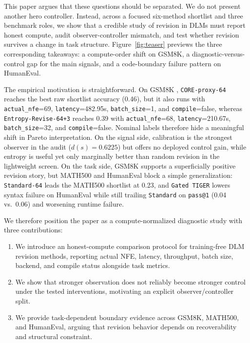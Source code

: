 \documentclass{article}
\begin{document}
This paper argues that these questions should be separated. We do not present another hero controller. Instead, across a focused six-method shortlist and three benchmark roles, we show that a credible study of revision in DLMs must report honest compute, audit observer-controller mismatch, and test whether revision survives a change in task structure. Figure~\ref{fig:teaser} previews the three corresponding takeaways: a compute-order shift on GSM8K, a diagnostic-versus-control gap for the main signals, and a code-boundary failure pattern on HumanEval.

The empirical motivation is straightforward. On GSM8K \citep{cobbe2021gsm8k}, \texttt{CORE-proxy-64} reaches the best raw shortlist accuracy (0.46), but it also runs with \texttt{actual\_nfe}=69, \texttt{latency}=482.95s, \texttt{batch\_size}=1, and \texttt{compile}=false, whereas \texttt{Entropy-Revise-64+3} reaches 0.39 with \texttt{actual\_nfe}=68, \texttt{latency}=210.67s, \texttt{batch\_size}=32, and \texttt{compile}=false. Nominal labels therefore hide a meaningful shift in Pareto interpretation. On the signal side, calibration is the strongest observer in the audit ($d(s)=0.6225$) but offers no deployed control gain, while entropy is useful yet only marginally better than random revision in the lightweight screen. On the task side, GSM8K supports a superficially positive revision story, but MATH500 and HumanEval block a simple generalization: \texttt{Standard-64} leads the MATH500 shortlist at 0.23, and \texttt{Gated TIGER} lowers syntax failure on HumanEval while still trailing \texttt{Standard} on \texttt{pass@1} (0.04 vs.\ 0.06) and worsening runtime failure.

We therefore position the paper as a compute-normalized diagnostic study with three contributions:
\begin{enumerate}
  \item We introduce an honest-compute comparison protocol for training-free DLM revision methods, reporting actual NFE, latency, throughput, batch size, backend, and compile status alongside task metrics.
  \item We show that stronger observation does not reliably become stronger control under the tested interventions, motivating an explicit observer/controller split.
  \item We provide task-dependent boundary evidence across GSM8K, MATH500, and HumanEval, arguing that revision behavior depends on recoverability and structural constraint.
\end{enumerate}
\end{document}

